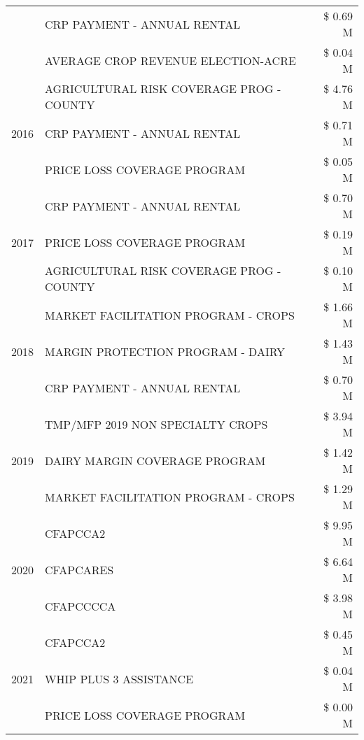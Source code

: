 \begin{tabular}{llr}
 & CRP PAYMENT - ANNUAL RENTAL & \$ 0.69 M \\
 & AVERAGE CROP REVENUE ELECTION-ACRE & \$ 0.04 M \\
\cline{1-3}
\multirow[t]{3}{*}{2016} & AGRICULTURAL RISK COVERAGE PROG - COUNTY & \$ 4.76 M \\
 & CRP PAYMENT - ANNUAL RENTAL & \$ 0.71 M \\
 & PRICE LOSS COVERAGE PROGRAM & \$ 0.05 M \\
\cline{1-3}
\multirow[t]{3}{*}{2017} & CRP PAYMENT - ANNUAL RENTAL & \$ 0.70 M \\
 & PRICE LOSS COVERAGE PROGRAM & \$ 0.19 M \\
 & AGRICULTURAL RISK COVERAGE PROG - COUNTY & \$ 0.10 M \\
\cline{1-3}
\multirow[t]{3}{*}{2018} & MARKET FACILITATION PROGRAM - CROPS & \$ 1.66 M \\
 & MARGIN PROTECTION PROGRAM - DAIRY & \$ 1.43 M \\
 & CRP PAYMENT - ANNUAL RENTAL & \$ 0.70 M \\
\cline{1-3}
\multirow[t]{3}{*}{2019} & TMP/MFP 2019 NON SPECIALTY CROPS & \$ 3.94 M \\
 & DAIRY MARGIN COVERAGE PROGRAM & \$ 1.42 M \\
 & MARKET FACILITATION PROGRAM - CROPS & \$ 1.29 M \\
\cline{1-3}
\multirow[t]{3}{*}{2020} & CFAPCCA2 & \$ 9.95 M \\
 & CFAPCARES & \$ 6.64 M \\
 & CFAPCCCCA & \$ 3.98 M \\
\cline{1-3}
\multirow[t]{3}{*}{2021} & CFAPCCA2 & \$ 0.45 M \\
 & WHIP PLUS 3 ASSISTANCE & \$ 0.04 M \\
 & PRICE LOSS COVERAGE PROGRAM & \$ 0.00 M \\
\cline{1-3}
\bottomrule
\end{tabular}
